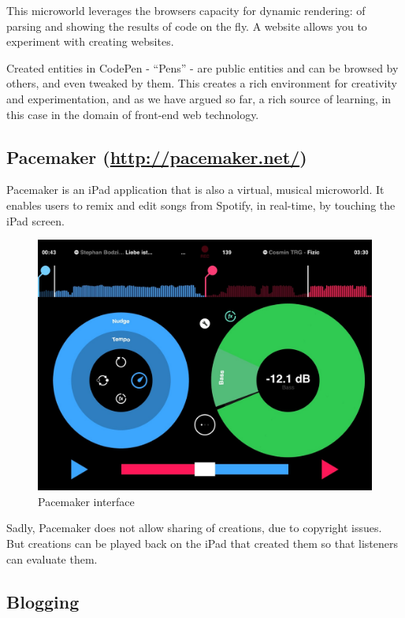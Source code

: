 This microworld leverages the browsers capacity for dynamic rendering:
of parsing and showing the results of code on the fly. A website allows
you to experiment with creating websites.

Created entities in CodePen - ``Pens'' - are public entities and can be
browsed by others, and even tweaked by them. This creates a rich
environment for creativity and experimentation, and as we have argued so
far, a rich source of learning, in this case in the domain of front-end
web technology.

\subsection{Pacemaker (\url{http://pacemaker.net/})}

Pacemaker is an iPad application that is also a virtual, musical microworld. It enables users to remix and edit songs from Spotify, in real-time, by touching the iPad screen.

\begin{figure}[ht!]
\centering
\includegraphics[width=123mm]{img/pacemaker.jpg}
\caption{Pacemaker interface}
\label{overflow}
\end{figure}

Sadly, Pacemaker does not allow sharing of creations, due to copyright issues. But creations can be played back on the iPad that created them so that listeners can evaluate them. 

\subsection{Blogging}

